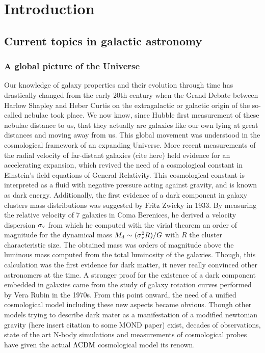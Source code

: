 \clearpage
\section{Introduction}
\label{sec:Intro}

\subsection{Current topics in galactic astronomy}

\subsubsection{A global picture of the Universe}

Our knowledge of galaxy properties and their evolution through time has drastically changed from the early 20th century when the Grand Debate between Harlow Shapley and Heber Curtis on the extragalactic or galactic origin of the so-called nebulae took place. We now know, since Hubble first measurement of these nebulae distance to us, that they actually are galaxies like our own lying at great distances and moving away from us. This global movement was understood in the cosmological framework of an expanding Universe. More recent measurements of the radial velocity of far-distant galaxies (cite here) held evidence for an accelerating expansion, which revived the need of a cosmological constant in Einstein's field equations of General Relativity. This cosmological constant is interpreted as a fluid with negative pressure acting against gravity, and is known as dark energy. Additionally, the first evidence of a dark component in galaxy clusters mass distributions was suggested by Fritz Zwicky in 1933. By measuring the relative velocity of $7$ galaxies in Coma Berenices, he derived a velocity dispersion $\sigma_{\rm{v}}$ from which he computed with the virial theorem an order of magnitude for the dynamical mass $M_{\rm{d}} \sim (\sigma_{\rm{v}}^2 R ) / G$ with $R$ the cluster characteristic size. The obtained mass was orders of magnitude above the luminous mass computed from the total luminosity of the galaxies. Though, this calculation was the first evidence for dark matter, it never really convinced other astronomers at the time. A stronger proof for the existence of a dark component embedded in galaxies came from the study of galaxy rotation curves performed by Vera Rubin in the 1970s. From this point onward, the need of a unified cosmological model including these new aspects became obvious. Though other models trying to describe dark mater as a manifestation of a modified newtonian gravity (here insert citation to some MOND paper) exist, decades of observations, state of the art N-body simulations and measurements of cosmological probes have given the actual $\Lambda \rm{CDM}$ cosmological model its renown. \\

